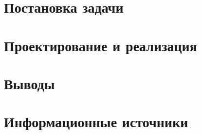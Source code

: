 \documentclass[a4paper]{report}
\author{Буренин А.А}
\begin{document}

    \tableofcontents{}
    \clearpage

    \section{Постановка задачи}
    \blindtext

    \section{Проектирование и реализация}
    \blindtext
    \section{Выводы}
    \blindtext

    \section{Информационные источники}
    \blindtext
\end{document}

